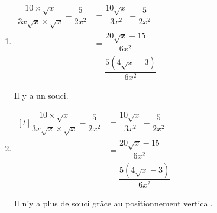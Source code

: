 \documentclass[10pt,a4paper]{article}
\begin{document}
\begin{enumerate}
	\item $\begin{aligned}
		\dfrac{10 \times \sqrt{x}}{3 x \sqrt{x} \times \sqrt{x}} - \dfrac{5}{2 x^2}
			& = \dfrac{10 \sqrt{x}}{3 x^2} - \dfrac{5}{2 x^2} \\
			& = \dfrac{20 \sqrt{x} - 15}{6 x^2} \\
			& = \dfrac{5 \left( 4\sqrt{x} - 3 \right) }{6 x^2}
	\end{aligned}$

	Il y a un souci.

	\item $\begin{aligned}[t]
		\dfrac{10 \times \sqrt{x}}{3 x \sqrt{x} \times \sqrt{x}} - \dfrac{5}{2 x^2}
			& = \dfrac{10 \sqrt{x}}{3 x^2} - \dfrac{5}{2 x^2} \\
			& = \dfrac{20 \sqrt{x} - 15}{6 x^2} \\
			& = \dfrac{5 \left( 4\sqrt{x} - 3 \right) }{6 x^2}
	\end{aligned}$

	Il n'y a plus de souci grâce au positionnement vertical.
\end{enumerate}
\end{document}

